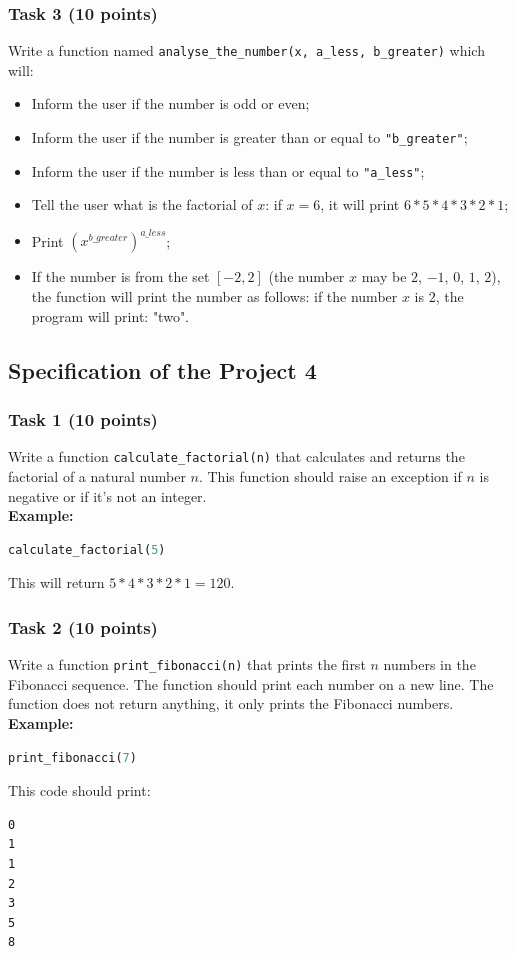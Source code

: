 \documentclass[12pt]{article}
\begin{document}
\subsubsection{Task 3 (10 points)}
Write a function named \texttt{analyse\_the\_number(x, a\_less, b\_greater)} which will:
\begin{itemize}
\item Inform the user if the number is odd or even;
\item Inform the user if the number is greater than or equal to \texttt{"b\_greater"};
\item Inform the user if the number is less than or equal to \texttt{"a\_less"};
\item Tell the user what is the factorial of $x$: if $x = 6$, it will print $6*5*4*3*2*1$;
\item Print $(x^{b\_greater})^{a\_less}$;
\item If the number is from the set $[-2, 2]$ (the number $x$ may be $2$, $-1$, $0$, $1$, $2$), the function will print the number as follows: if the number $x$ is $2$, the program will print: "two".
\end{itemize}

\subsection{Specification of the Project 4}

\subsubsection{Task 1 (10 points)}
Write a function \texttt{calculate\_factorial(n)} that calculates and returns the factorial of a natural number $n$. This function should raise an exception if $n$ is negative or if it's not an integer. \\
\textbf{Example:}
\begin{lstlisting}[language=Python]
calculate_factorial(5)
\end{lstlisting}
This will return $5*4*3*2*1 = 120$.

\subsubsection{Task 2 (10 points)}
Write a function \texttt{print\_fibonacci(n)} that prints the first $n$ numbers in the Fibonacci sequence. The function should print each number on a new line. The function does not return anything, it only prints the Fibonacci numbers. \\
\textbf{Example:}
\begin{lstlisting}[language=Python]
print_fibonacci(7)
\end{lstlisting}
This code should print:
\begin{verbatim}
0
1
1
2
3
5
8
\end{verbatim}
\end{document}
